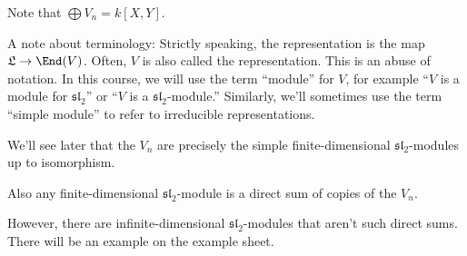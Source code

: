 Note that $\bigoplus V_n = k[X, Y]$.

A note about terminology: Strictly speaking, the representation is the map
$\mathfrak{L}\to \End(V)$. Often, $V$ is also called the representation. This
is an abuse of notation. In this course, we will use the term \enquote{module}
for $V$, for example \enquote{$V$ is a module for $\mathfrak{sl}_2$} or
\enquote{$V$ is a $\mathfrak{sl}_2$-module.} Similarly, we'll sometimes use
the term \enquote{simple module} to refer to irreducible representations.

We'll see later that the $V_n$ are precisely the simple finite-dimensional
$\mathfrak{sl}_2$-modules up to isomorphism.

Also any finite-dimensional $\mathfrak{sl}_2$-module is a direct sum of copies
of the $V_n$.

However, there are infinite-dimensional $\mathfrak{sl}_2$-modules that aren't
such direct sums. There will be an example on the example sheet.
